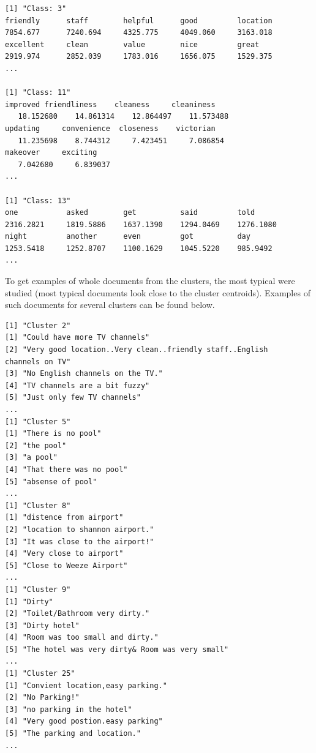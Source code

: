 \begin{lstlisting}
[1] "Class: 3"
friendly      staff        helpful      good         location
7854.677      7240.694     4325.775     4049.060     3163.018
excellent     clean        value        nice         great
2919.974      2852.039     1783.016     1656.075     1529.375
...

[1] "Class: 11"
improved friendliness    cleaness     cleaniness
   18.152680    14.861314    12.864497    11.573488
updating     convenience  closeness    victorian
   11.235698    8.744312     7.423451     7.086854
makeover     exciting
   7.042680     6.839037
...

[1] "Class: 13"
one           asked        get          said         told
2316.2821     1819.5886    1637.1390    1294.0469    1276.1080
night         another      even         got          day
1253.5418     1252.8707    1100.1629    1045.5220    985.9492
...
\end{lstlisting}

To get examples of whole documents from the clusters, the most typical were studied (most typical documents look close to the cluster centroids). Examples of such documents for several clusters can be found below.\\
\begin{verbatim}
[1] "Cluster 2"
[1] "Could have more TV channels"
[2] "Very good location..Very clean..friendly staff..English 
channels on TV"
[3] "No English channels on the TV."
[4] "TV channels are a bit fuzzy"
[5] "Just only few TV channels"
...
[1] "Cluster 5"
[1] "There is no pool"
[2] "the pool"
[3] "a pool"
[4] "That there was no pool"
[5] "absense of pool"
...
[1] "Cluster 8"
[1] "distence from airport"
[2] "location to shannon airport."
[3] "It was close to the airport!"
[4] "Very close to airport"
[5] "Close to Weeze Airport"
...
[1] "Cluster 9"
[1] "Dirty"
[2] "Toilet/Bathroom very dirty."
[3] "Dirty hotel"
[4] "Room was too small and dirty."
[5] "The hotel was very dirty& Room was very small"
...
[1] "Cluster 25"
[1] "Convient location,easy parking."
[2] "No Parking!"
[3] "no parking in the hotel"
[4] "Very good postion.easy parking"
[5] "The parking and location."
...
\end{verbatim}

% 